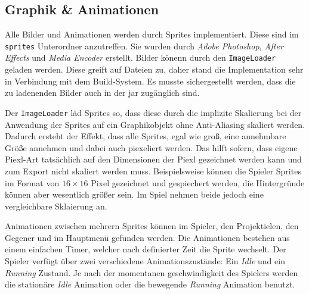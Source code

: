 \subsection{Graphik \& Animationen}

Alle Bilder und Animationen werden durch Sprites implementiert.
Diese sind im \texttt{sprites} Unterordner anzutreffen.
Sie wurden durch \textit{Adobe Photoshop}, \textit{After Effects} und \textit{Media Encoder} erstellt.
Bilder könenn durch den \texttt{ImageLoader} geladen werden.
Diese greift auf Dateien zu, daher stand die Implementation sehr in Verbindung mit dem Build-System.
Es musste sichergestellt werden, dass die zu ladenenden Bilder auch in der \gls{jar} zugänglich sind.

Der \texttt{ImageLoader} läd Sprites so, dass diese durch die implizite Skalierung bei der Anwendung der Sprites auf ein Graphikobjekt ohne Anti-Aliasing skaliert werden.
Dadurch ersteht der Effekt, dass alle Sprites, egal wie groß, eine annehmbare Größe annehmen und dabei auch piexeliert werden.
Das hilft sofern, dass eigene Piexl-Art tatsächlich auf den Dimensionen der Piexl gezeichnet werden kann und zum Export nicht skaliert werden muss.
Beispielsweise können die Spieler Sprites im Format von $16 \times 16$ Pixel gezeichnet und gespiechert werden, die Hintergründe können aber wesentlich größer sein.
Im Spiel nehmen beide jedoch eine vergleichbare Sklaierung an.

Animationen zwischen mehrern Sprites können im Spieler, den Projektielen, den Gegener und im Hauptmenü gefunden werden.
Die Animationen bestehen aus einem einfachen Timer, welcher nach definierter Zeit die Sprite wechselt.
Der Spieler verfügt über zwei verschiedene Animationszustände: Ein \textit{Idle} und ein \textit{Running} Zustand.
Je nach der momentanen geschwindigkeit des Spielers werden die stationäre \textit{Idle} Animation oder die bewegende \textit{Running} Animation benutzt.

